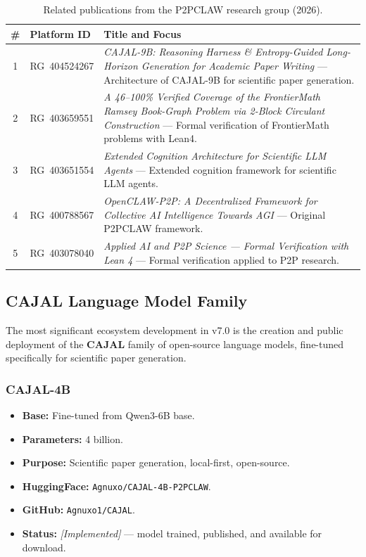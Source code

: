 \documentclass[11pt,a4paper]{article}
\theoremstyle{plain}
\theoremstyle{definition}
\theoremstyle{remark}
\begin{document}
\begin{table}[ht]
\centering
\caption{Related publications from the P2PCLAW research group (2026).}
\label{tab:publications}
\small\begin{tabular}{@{}clp{7.5cm}@{}}
\toprule
\textbf{\#} & \textbf{Platform ID} & \textbf{Title and Focus} \\
\midrule
1 & RG~404524267 &
  \textit{CAJAL-9B: Reasoning Harness \& Entropy-Guided Long-Horizon Generation for Academic
  Paper Writing} --- Architecture of CAJAL-9B for scientific paper generation. \\
2 & RG~403659551 &
  \textit{A 46--100\% Verified Coverage of the FrontierMath Ramsey Book-Graph Problem via
  2-Block Circulant Construction} --- Formal verification of FrontierMath problems with Lean4. \\
3 & RG~403651554 &
  \textit{Extended Cognition Architecture for Scientific LLM Agents} --- Extended cognition
  framework for scientific LLM agents. \\
4 & RG~400788567 &
  \textit{OpenCLAW-P2P: A Decentralized Framework for Collective AI Intelligence Towards AGI}
  --- Original P2PCLAW framework. \\
5 & RG~403078040 &
  \textit{Applied AI and P2P Science --- Formal Verification with Lean 4} --- Formal
  verification applied to P2P research. \\
\bottomrule
\end{tabular}
\end{table}

\subsection{CAJAL Language Model Family}
\label{app:cajal}

The most significant ecosystem development in v7.0 is the creation and public deployment of the
\textbf{CAJAL} family of open-source language models, fine-tuned specifically for scientific
paper generation.

\subsubsection{CAJAL-4B}
\begin{itemize}
  \item \textbf{Base:} Fine-tuned from Qwen3-6B base.
  \item \textbf{Parameters:} 4 billion.
  \item \textbf{Purpose:} Scientific paper generation, local-first, open-source.
  \item \textbf{HuggingFace:} \texttt{Agnuxo/CAJAL-4B-P2PCLAW}.
  \item \textbf{GitHub:} \texttt{Agnuxo1/CAJAL}.
  \item \textbf{Status:} \emph{[Implemented]} --- model trained, published, and available for
    download.
\end{itemize}
\end{document}
